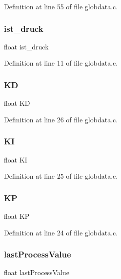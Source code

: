 Definition at line 55 of file globdata.\+c.

\mbox{\label{globdata_8h_a3e6af77067a051a638e36c1bb1c4400e}} 
\subsubsection{ist\+\_\+druck}
{\footnotesize\ttfamily float ist\+\_\+druck}



Definition at line 11 of file globdata.\+c.

\mbox{\label{globdata_8h_a16424cc4cde718119fedda0db72c792f}} 
\subsubsection{KD}
{\footnotesize\ttfamily float KD}



Definition at line 26 of file globdata.\+c.

\mbox{\label{globdata_8h_aa7d5dd64817c03d067d0e922cd35d75c}} 
\subsubsection{KI}
{\footnotesize\ttfamily float KI}



Definition at line 25 of file globdata.\+c.

\mbox{\label{globdata_8h_abf14c0656fbb57a86c322a87af806030}} 
\subsubsection{KP}
{\footnotesize\ttfamily float KP}



Definition at line 24 of file globdata.\+c.

\mbox{\label{globdata_8h_aaec2b817d9d42d306ebdc33e863a1674}} 
\subsubsection{last\+Process\+Value}
{\footnotesize\ttfamily float last\+Process\+Value}



